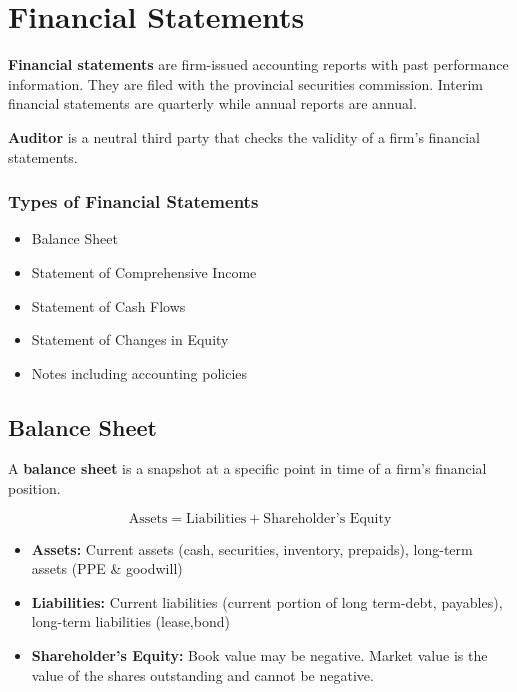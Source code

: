 \documentclass[english, 12pt]{article}
\begin{document}
\section{Financial Statements}

\begin{defn}
\textbf{Financial statements} are firm-issued accounting reports with past performance information. They are filed with the provincial securities commission. Interim financial statements are quarterly while annual reports are annual.
\end{defn}

\begin{defn}
\textbf{Auditor} is a neutral third party that checks the validity of a firm's financial statements.
\end{defn}

\subsubsection*{Types of Financial Statements}
\begin{itemize}
\item Balance Sheet
\item Statement of Comprehensive Income
\item Statement of Cash Flows
\item Statement of Changes in Equity
\item Notes including accounting policies
\end{itemize}

\subsection{Balance Sheet}
\begin{defn}
A \textbf{balance sheet} is a snapshot at a specific point in time of a firm's financial position.
\end{defn}
\[ \text{Assets}  = \text{Liabilities} + \text{Shareholder's Equity}\]
\begin{itemize}
\item \textbf{Assets:} Current assets (cash, securities, inventory, prepaids), long-term assets (PPE \& goodwill) \\
\item \textbf{Liabilities:} Current liabilities (current portion of long term-debt, payables), long-term liabilities (lease,bond)
\item \textbf{Shareholder's Equity:} Book value may be negative. Market value is the value of the shares outstanding and cannot be negative.
\end{itemize}
\end{document}

